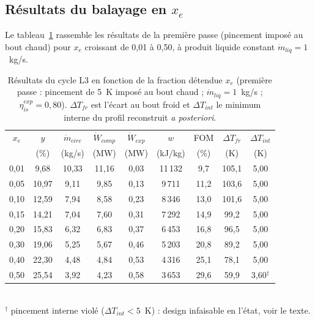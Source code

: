 \subsection{Résultats du balayage en \texorpdfstring{$x_e$}{xe}}
\label{sec:resultats_L3}

Le tableau~\ref{tab:sweep} rassemble les résultats de la première passe
(pincement imposé au bout chaud) pour $x_e$ croissant de 0{,}01 à 0{,}50, à
produit liquide constant $\dot m_{liq} = 1$~kg/s.

\begin{table}[H]
  \centering
  \caption{Résultats du cycle L3 en fonction de la fraction détendue $x_e$
  (première passe : pincement de 5~K imposé au bout chaud ;
  $\dot m_{liq} = 1$~kg/s ; $\eta_{is}^{exp} = 0{,}80$). $\Delta T_{fr}$ est
  l'écart au bout froid et $\Delta T_{int}$ le minimum interne du profil
  reconstruit \emph{a posteriori}.}
  \label{tab:sweep}
  \small
  \setlength{\tabcolsep}{4pt}
  \begin{tabular}{ccccccccc}
    \toprule
    $x_e$ & $y$ & $\dot m_{circ}$ & $\dot W_{comp}$ & $\dot W_{exp}$ &
    $w$ & FOM & $\Delta T_{fr}$ & $\Delta T_{int}$ \\
     & (\%) & (kg/s) & (MW) & (MW) & (kJ/kg) & (\%) & (K) & (K) \\
    \midrule
    0,01 & 9,68  & 10,33 & 11,16 & 0,03 & 11\,132 & 9,7  & 105,1 & 5,00 \\
    0,05 & 10,97 & 9,11  & 9,85  & 0,13 & 9\,711  & 11,2 & 103,6 & 5,00 \\
    0,10 & 12,59 & 7,94  & 8,58  & 0,23 & 8\,346  & 13,0 & 101,6 & 5,00 \\
    0,15 & 14,21 & 7,04  & 7,60  & 0,31 & 7\,292  & 14,9 & 99,2  & 5,00 \\
    0,20 & 15,83 & 6,32  & 6,83  & 0,37 & 6\,453  & 16,8 & 96,5  & 5,00 \\
    0,30 & 19,06 & 5,25  & 5,67  & 0,46 & 5\,203  & 20,8 & 89,2  & 5,00 \\
    0,40 & 22,30 & 4,48  & 4,84  & 0,53 & 4\,316  & 25,1 & 78,1  & 5,00 \\
    0,50 & 25,54 & 3,92  & 4,23  & 0,58 & 3\,653  & 29,6 & 59,9  & 3,60$^{\dagger}$ \\
    \bottomrule
  \end{tabular}\\[0.2em]
  {\footnotesize $^{\dagger}$ pincement interne violé ($\Delta T_{int} <
  5$~K) : design infaisable en l'état, voir le texte.}
\end{table}

